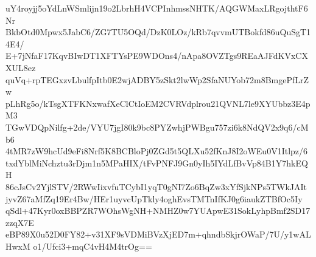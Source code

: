uY4royjj5oYdLnWSmlijn19o2LbrhH4VCPInhmssNHTK/AQGWMaxLRgojthtF6Nr
BkbOtd0Mpwx5JabC6/ZG7TU5OQd/DzK0LOz/kRb7qvvmUTBokfd86uQuSgT14E4/
E+7jNfaF17KqvBIwDT1XFTYsPE9WDOns4/nApa8OVZTgs9REaAJFdKVxCXXUL8ez
quVq+rpTEGxzvLbulfpItb0E2wjADBY5zSkt2lwWp2SfaNUYob72m8BmgePfLrZw
pLhRg5o/kTsgXTFKNxwafXeClCtIoEM2CVRVdplrou21QVNL7le9XYUbbz3E4pM3
TGwVDQpNilfg+2de/VYU7jgI80k9bc8PYZwhjPWBgu757zi6k8NdQV2x9q6/cMb6
4tMR7zW9hcUd9eFi8Nrf5K8BCBloPj0ZGd5t5QLXu52fKnJ8I2oWEu0V1Itlpz/6
txdYblMiNchztu3rDjm1n5MPaHIX/tFvPNFJ9Gn0yIh5IYdLfBvVp84B1Y7hkEQH
86cJsCv2YjlSTV/2RWwIixvfuTCybI1yqT0gNI7Zo6BqZw3xYfSjkNPs5TWkJAIt
jyvZ67aMfZq19Er4Bw/HEr1uyvcUpTkly4oghEvsTMTnIfKJ0g6iaukZTBfOc5Iy
qSdl+47Kyr0oxBBPZR7WOhsWgNH+NMHZ0w7YUApwE31SokLyhpBmf2SD17zzqX7E
eBP89X0u52D0FY82+v31XF9sVDMiBVzXjED7m+qhndbSkjrOWaP/7U/y1wALHwxM
o1/Ufci3+mqC4vH4M4trOg==

